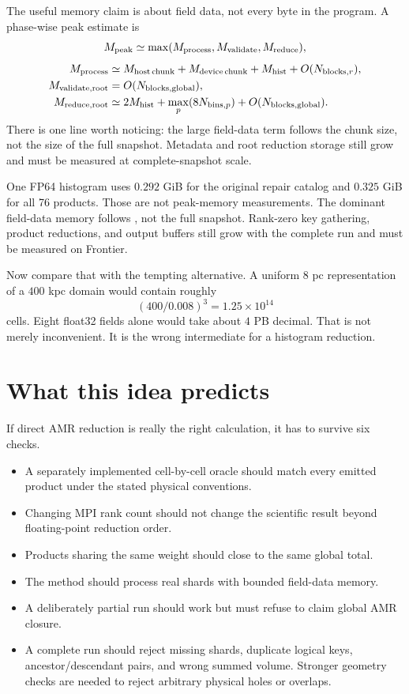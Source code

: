 \documentclass[11pt]{article}
\begin{document}
The useful memory claim is about field data, not every byte in the program.
A phase-wise peak estimate is
\[
M_{\rm peak}\simeq \max(M_{\rm process},M_{\rm validate},M_{\rm reduce}),
\]
\[
\begin{split}
M_{\rm process}&\simeq M_{\rm host\,chunk}+M_{\rm device\,chunk}
 + M_{\rm hist}+O(N_{{\rm blocks},r}),\\
M_{\rm validate,root}&=O(N_{\rm blocks,global}),\\
M_{\rm reduce,root}&\simeq 2M_{\rm hist}
 + \max_p(8N_{{\rm bins},p})+O(N_{\rm blocks,global}).
\end{split}
\]
There is one line worth noticing: the large field-data term follows the chunk
size, not the size of the full snapshot. Metadata and root reduction storage
still grow and must be measured at complete-snapshot scale.

One FP64 histogram uses \(0.292\) GiB for the original repair catalog and
\(0.325\) GiB for all 76 products. Those are not peak-memory measurements. The
dominant field-data memory follows
, not the full snapshot. Rank-zero key gathering,
product reductions, and output buffers still grow with the complete run and
must be measured on Frontier.

Now compare that with the tempting alternative. A uniform 8 pc representation
of a \(400\) kpc domain would contain roughly
\[
(400/0.008)^3=1.25\times10^{14}
\]
cells. Eight float32 fields alone would take about \(4\) PB decimal. That is
not merely inconvenient. It is the wrong intermediate for a histogram
reduction.

\section{What this idea predicts}

If direct AMR reduction is really the right calculation, it has to survive six
checks.

\begin{itemize}
  \item A separately implemented cell-by-cell oracle should match every emitted
        product under the stated physical conventions.
  \item Changing MPI rank count should not change the scientific result beyond
        floating-point reduction order.
  \item Products sharing the same weight should close to the same global total.
  \item The method should process real shards with bounded field-data memory.
  \item A deliberately partial run should work but must refuse to claim global
        AMR closure.
  \item A complete run should reject missing shards, duplicate logical keys,
        ancestor/descendant pairs, and wrong summed volume. Stronger geometry
        checks are needed to reject arbitrary physical holes or overlaps.
\end{itemize}
\end{document}
